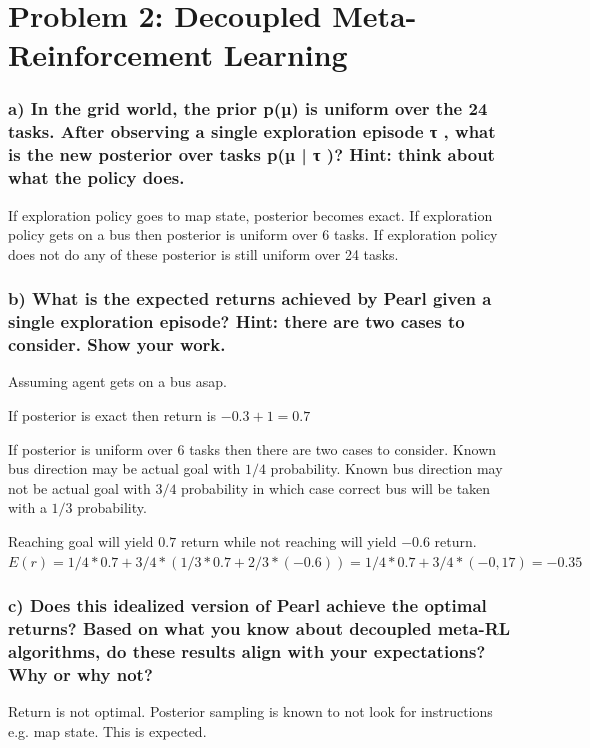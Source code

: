 \documentclass[12pt]{article}
\begin{document}
\newpage
\section*{Problem 2: Decoupled Meta-Reinforcement Learning}

\subsubsection*{a) In the grid world, the prior p(µ) is uniform over the 24 tasks. After observing a single exploration episode τ , what is the new posterior over tasks p(µ | τ )? Hint: think about what the policy does.}

If exploration policy goes to map state, posterior becomes exact.
If exploration policy gets on a bus then posterior is uniform over 6 tasks.
If exploration policy does not do any of these posterior is still uniform over 24 tasks.

\subsubsection*{b) What is the expected returns achieved by Pearl given a single exploration episode? Hint: there are two cases to consider. Show your work.}

Assuming agent gets on a bus asap.

If posterior is exact then return is $ -0.3 + 1 = 0.7 $

If posterior is uniform over 6 tasks then there are two cases to consider.
Known bus direction may be actual goal with $ 1/4 $ probability.
Known bus direction may not be actual goal with $ 3/4 $ probability in which case correct bus will be taken with a $ 1/3 $ probability.

Reaching goal will yield $0.7$ return while not reaching will yield $-0.6$ return.
$E(r) = 1/4 * 0.7 + 3/4 * (1/3* 0.7 + 2/3 * (-0.6)) =  1/4 * 0.7 + 3/4 * (-0,17) =  -0.35 $

\subsubsection*{c) Does this idealized version of Pearl achieve the optimal returns? Based on what you know about decoupled meta-RL algorithms, do these results align with your expectations? Why or why not?}

Return is not optimal. Posterior sampling is known to not look for instructions e.g. map state. This is expected.

\newpage
\end{document}
